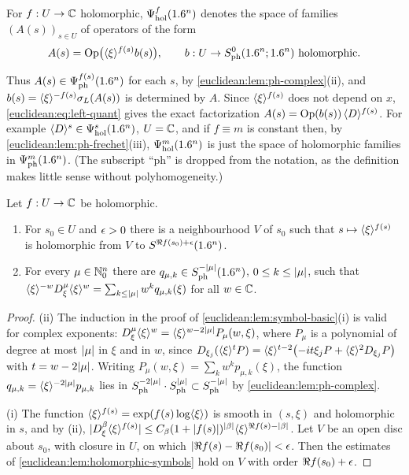 \begin{definition}\label{euclidean:def:hol-family}
  For $f:U\to\mathbb{C}$ holomorphic, $\Psi^{f}_{\mathrm{hol}}(1.6^n)$ denotes the
  space of families $(A(s))_{s\in U}$ of operators of the form
  \begin{equation*}
    A(s)=\operatorname{Op}\bigl(\langle \xi\rangle^{f(s)}b(s)\bigr),\qquad
    b:U\to S^{0}_{\mathrm{ph}}(1.6^n;1.6^n)\ \text{holomorphic}.
  \end{equation*}
\end{definition}

Thus $A(s)\in\Psi^{f(s)}_{\mathrm{ph}}(1.6^n)$ for each $s$, by
\cref{euclidean:lem:ph-complex}(ii), and $b(s)=\langle \xi\rangle^{-f(s)}\sigma_L(A(s))$ is
determined by $A$. Since $\langle \xi\rangle^{f(s)}$ does not depend on $x$,
\eqref{euclidean:eq:left-quant} gives the exact factorization
$A(s)=\operatorname{Op}(b(s))\,\langle D\rangle^{f(s)}$. For example $\langle D\rangle^{s}\in\Psi^{s}_{\mathrm{hol}}(1.6^n)$,
$U=\mathbb{C}$, and if $f\equiv m$ is constant then, by
\cref{euclidean:lem:ph-frechet}(iii), $\Psi^{m}_{\mathrm{hol}}(1.6^n)$ is just the
space of holomorphic families in $\Psi^{m}_{\mathrm{ph}}(1.6^n)$. (The
subscript ``ph'' is dropped from the notation, as the definition makes
little sense without polyhomogeneity.)

\begin{lemma}\label{euclidean:lem:japanese-holomorphic}
  Let $f:U\to\mathbb{C}$ be holomorphic.
  \begin{enumerate}[label=\textup{(\roman*)}]
  \item For $s_0\in U$ and $\epsilon>0$ there is a neighbourhood $V$ of $s_0$
    such that $s\mapsto\langle \xi\rangle^{f(s)}$ is holomorphic from $V$ to
    $S^{\Re f(s_0)+\epsilon}(1.6^n)$.
  \item For every $\mu\in\mathbb{N}_0^n$ there are $q_{\mu,k}\in S^{-\lvert \mu\rvert}_{\mathrm{ph}}(1.6^n)$,
    $0\le k\le\lvert \mu\rvert$, such that
    $\langle \xi\rangle^{-w}D^\mu_\xi\langle \xi\rangle^{w}=\sum_{k\le\lvert \mu\rvert}w^kq_{\mu,k}(\xi)$ for all
    $w\in\mathbb{C}$.
  \end{enumerate}
\end{lemma}
\begin{proof}
  (ii) The induction in the proof of \cref{euclidean:lem:symbol-basic}(i) is
  valid for complex exponents: $D^\mu_\xi\langle \xi\rangle^w=\langle \xi\rangle^{w-2\lvert \mu\rvert}P_\mu(w,\xi)$,
  where $P_\mu$ is a polynomial of degree at most $\lvert \mu\rvert$ in $\xi$ and in
  $w$, since
  $D_{\xi_j}(\langle \xi\rangle^{t}P)=\langle \xi\rangle^{t-2}\bigl(-it\xi_jP+\langle \xi\rangle^2D_{\xi_j}P\bigr)$
  with $t=w-2\lvert \mu\rvert$. Writing $P_\mu(w,\xi)=\sum_kw^kp_{\mu,k}(\xi)$, the
  function $q_{\mu,k}=\langle \xi\rangle^{-2\lvert \mu\rvert}p_{\mu,k}$ lies in
  $S^{-2\lvert \mu\rvert}_{\mathrm{ph}}\cdot S^{\lvert \mu\rvert}_{\mathrm{ph}}\subset S^{-\lvert \mu\rvert}_{\mathrm{ph}}$ by
  \cref{euclidean:lem:ph-complex}.

  (i) The function $\langle \xi\rangle^{f(s)}=\exp(f(s)\log\langle \xi\rangle)$ is smooth in
  $(s,\xi)$ and holomorphic in $s$, and by (ii),
  $\lvert D^\beta_\xi\langle \xi\rangle^{f(s)}\rvert\le C_\beta(1+\lvert f(s)\rvert)^{\lvert \beta\rvert}\langle \xi\rangle^{\Re f(s)-\lvert \beta\rvert}$.
  Let $V$ be an open disc about $s_0$, with closure in $U$, on which
  $\lvert \Re f(s)-\Re f(s_0)\rvert<\epsilon$. Then the estimates of
  \cref{euclidean:lem:holomorphic-symbols} hold on $V$ with order
  $\Re f(s_0)+\epsilon$.
\end{proof}

